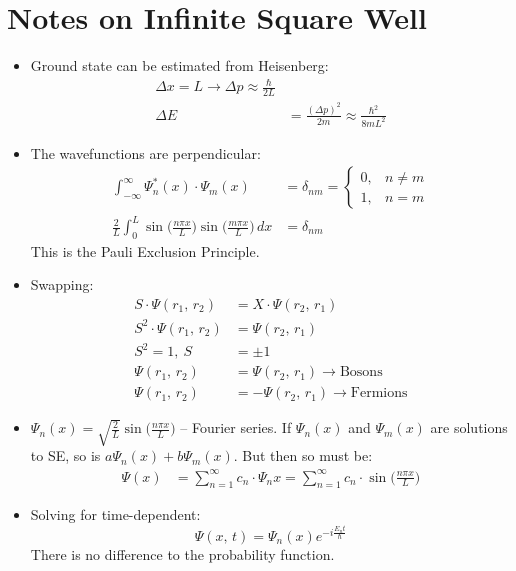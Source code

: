 \documentclass[a4paper, 11pt, normalem]{report}
\begin{document}
\section{Notes on Infinite Square Well}
\begin{itemize}
    \item Ground state can be estimated from Heisenberg:
        \begin{align}
            \Delta x = L \rightarrow \Delta p \approx \frac{\hbar}{2L} \\
            \Delta E &= \frac{(\Delta p)^{2}}{2m} \approx \frac{\hbar^{2}}{8mL^{2}}
        \end{align}
    \item The wavefunctions are perpendicular:
        \begin{align}
            \int_{-\infty}^{\infty} \Psi_{n}^{\ast}(x)\cdot\Psi_{m}(x) &= \delta_{nm} =  \begin{cases} 0, & n \neq m \\ 1, & n = m \end{cases} \\
            \frac{2}{L}\int_{0}^{L}\sin\Big(\frac{n\pi x}{L}\Big)\sin\Big(\frac{m\pi x}{L}\Big)\,dx &= \delta_{nm}
        \end{align}
        This is the Pauli Exclusion Principle.
    \item Swapping:
        \begin{align}
            S\cdot\Psi(r_{1},\,r_{2}) &= X\cdot\Psi(r_{2},\,r_{1}) \\
            S^{2}\cdot\Psi(r_{1},\,r_{2}) &= \Psi(r_{2},\,r_{1}) \\
            S^{2} = 1,~S &= \pm 1 \\
            \Psi(r_{1},\,r_{2}) &= \Psi(r_{2},\,r_{1}) \rightarrow \text{Bosons} \\
            \Psi(r_{1},\,r_{2}) &= -\Psi(r_{2},\,r_{1}) \rightarrow \text{Fermions}
        \end{align}
    \item $\Psi_{n}(x) = \sqrt{\frac{2}{L}}\sin\Big(\frac{n\pi x}{L}\Big)$ -- Fourier series.
        If $\Psi_{n}(x)$ and $\Psi_{m}(x)$ are solutions to SE, so is $a\Psi_{n}(x) + b\Psi_{m}(x)$.
        But then so must be:
        \begin{align}
            \Psi(x) &= \sum_{n = 1}^{\infty} c_{n}\cdot\Psi_{n}{x} = \sum_{n = 1}^{\infty} c_{n}\cdot\sin\Big(\frac{n\pi x}{L}\Big)
        \end{align}
    \item Solving for time-dependent:
        \begin{equation}
            \Psi(x,\,t) = \Psi_{n}(x)e^{-i\tfrac{E_{n}t}{\hbar}}
        \end{equation}
        There is no difference to the probability function.
\end{itemize}
\end{document}

